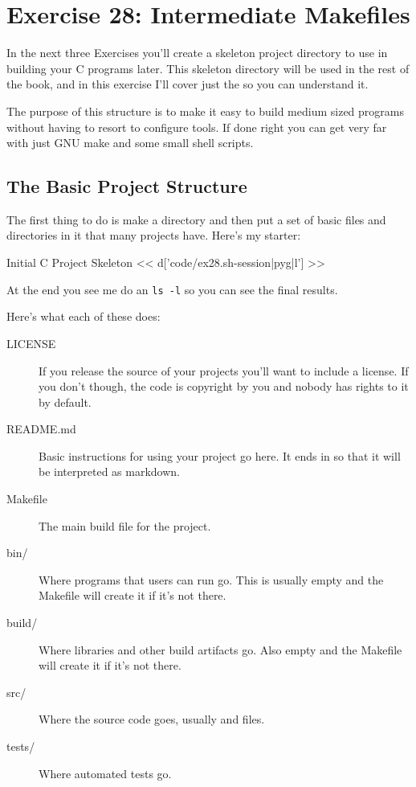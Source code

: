 \chapter{Exercise 28: Intermediate Makefiles}

In the next three Exercises you'll create a skeleton project directory to use
in building your C programs later.  This skeleton directory will be used in the
rest of the book, and in this exercise I'll cover just the  so
you can understand it.

The purpose of this structure is to make it easy to build medium sized programs
without having to resort to configure tools.  If done right you can get very far
with just GNU make and some small shell scripts.

\section{The Basic Project Structure}

The first thing to do is make a  directory and then put
a set of basic files and directories in it that many projects have.  Here's
my starter:

\begin{code}{Initial C Project Skeleton}
<< d['code/ex28.sh-session|pyg|l'] >>
\end{code}

At the end you see me do an \verb|ls -l| so you can see the final results.

Here's what each of these does:

\begin{description}
\item[LICENSE] If you release the source of your projects you'll want to 
    include a license.  If you don't though, the code is copyright by you
    and nobody has rights to it by default.
\item[README.md] Basic instructions for using your project go here.  It ends
    in  so that it will be interpreted as markdown.
\item[Makefile] The main build file for the project.
\item[bin/] Where programs that users can run go. This is usually empty and the Makefile will create it if it's not there.
\item[build/] Where libraries and other build artifacts go. Also empty and the Makefile will create it if it's not there.
\item[src/] Where the source code goes, usually  and  files.
\item[tests/] Where automated tests go.
\end{description}

